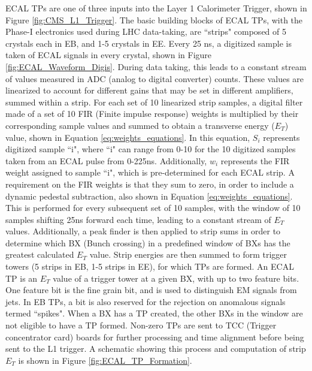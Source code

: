 ECAL TPs are one of three inputs into the Layer 1 Calorimeter Trigger, shown in Figure \ref{fig:CMS_L1_Trigger}. The basic building blocks of ECAL TPs, with the Phase-I electronics used during LHC data-taking, are ``strips" composed of 5 crystals each in EB, and 1-5 crystals in EE. Every 25 ns, a digitized sample is taken of ECAL signals in every crystal, shown in Figure \ref{fig:ECAL_Waveform_Digis}. During data taking, this leads to a constant stream of values measured in ADC (analog to digital converter) counts. These values are linearized to account for different gains that may be set in different amplifiers, summed within a strip. For each set of 10 linearized strip samples, a digital filter made of a set of 10 FIR (Finite impulse response) weights is multiplied by their corresponding sample values and summed to obtain a transverse energy ($E_{T}$) value, shown in Equation \ref{eq:weights_equations}. In this equation, $S_{i}$ represents digitized sample ``i", where ``i" can range from 0-10 for the 10 digitized samples taken from an ECAL pulse from 0-225ns. Additionally, $w_{i}$ represents the FIR weight assigned to sample ``i", which is pre-determined for each ECAL strip. A requirement on the FIR weights is that they sum to zero, in order to include a dynamic pedestal subtraction, also shown in Equation \ref{eq:weights_equations}. This is performed for every subsequent set of 10 samples, with the window of 10 samples shifting 25ns forward each time, leading to a constant stream of $E_{T}$ values. Additionally, a peak finder is then applied to strip sums in order to determine which BX (Bunch crossing) in a predefined window of BXs has the greatest calculated $E_{T}$ value. Strip energies are then summed to form trigger towers (5 strips in EB, 1-5 strips in EE), for which TPs are formed. An ECAL TP is an $E_{T}$ value of a trigger tower at a given BX, with up to two feature bits. One feature bit is the fine grain bit, and is used to distinguish EM signals from jets. In EB TPs, a bit is also reserved for the rejection on anomalous signals termed ``spikes". When a BX has a TP created, the other BXs in the window are not eligible to have a TP formed. Non-zero TPs are sent to TCC (Trigger concentrator card) boards for further processing and time alignment before being sent to the L1 trigger. A schematic showing this process and computation of strip $E_{T}$ is shown in Figure \ref{fig:ECAL_TP_Formation}.


